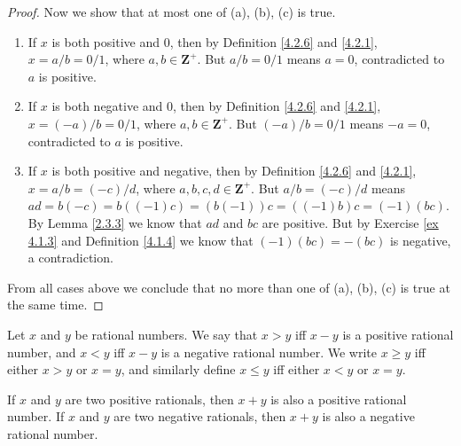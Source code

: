 \begin{proof}
    Now we show that at most one of (a), (b), (c) is true.
    \begin{enumerate}[label=(\Roman*)]
        \item If \(x\) is both positive and \(0\), then by Definition \ref{4.2.6} and \ref{4.2.1}, \(x = a / b = 0 / 1\), where \(a, b \in \mathbf{Z}^+\).
              But \(a / b = 0 / 1\) means \(a = 0\), contradicted to \(a\) is positive.
        \item If \(x\) is both negative and \(0\), then by Definition \ref{4.2.6} and \ref{4.2.1}, \(x = (-a) / b = 0 / 1\), where \(a, b \in \mathbf{Z}^+\).
              But \((-a) / b = 0 / 1\) means \(-a = 0\), contradicted to \(a\) is positive.
        \item If \(x\) is both positive and negative, then by Definition \ref{4.2.6} and \ref{4.2.1}, \(x = a / b = (-c) / d\), where \(a, b, c, d \in \mathbf{Z}^+\).
              But \(a / b = (-c) / d\) means \(ad = b(-c) = b((-1)c) = (b(-1))c = ((-1)b)c = (-1)(bc)\).
              By Lemma \ref{2.3.3} we know that \(ad\) and \(bc\) are positive.
              But by Exercise \ref{ex 4.1.3} and Definition \ref{4.1.4} we know that \((-1)(bc) = -(bc)\) is negative, a contradiction.
    \end{enumerate}
    From all cases above we conclude that no more than one of (a), (b), (c) is true at the same time.
\end{proof}

\begin{definition}\label{4.2.8}
    Let \(x\) and \(y\) be rational numbers.
    We say that \(x > y\) iff \(x - y\) is a positive rational number, and \(x < y\) iff \(x - y\) is a negative rational number.
    We write \(x \geq y\) iff either \(x > y\) or \(x = y\), and similarly define \(x \leq y\) iff either \(x < y\) or \(x = y\).
\end{definition}

\begin{additional corollary}\label{ac 4.2.4}
If \(x\) and \(y\) are two positive rationals, then \(x + y\) is also a positive rational number.
If \(x\) and \(y\) are two negative rationals, then \(x + y\) is also a negative rational number.
\end{additional corollary}

